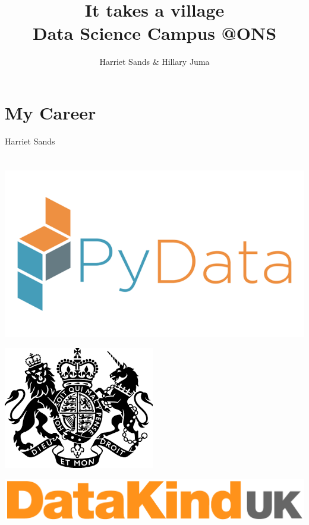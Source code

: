 \documentclass[11pt]{article}
\author{Harriet Sands \& Hillary Juma}
\date{}
\title{It takes a village\\\medskip
\large Data Science Campus @ONS}
\begin{document}
\maketitle
\section*{My Career}
\label{sec:orge012aa5}
Harriet Sands
\section*{}
\label{sec:org4847d18}
\begin{NOTES}
\end{NOTES}

\section*{}
\label{sec:org1949e62}
\begin{center}
\includegraphics[width=.9\linewidth]{./img/pydata.png}
\end{center}
\begin{center}
\includegraphics[width=.9\linewidth]{./img/hm-gov-logo.png}
\end{center}
\begin{center}
\includegraphics[width=.9\linewidth]{./img/datakind.png}
\end{center}
\end{document}
